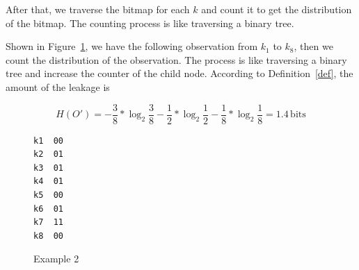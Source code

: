 After that, we traverse the bitmap for each $k$ and count it to get the distribution of the bitmap. The counting process is like traversing a binary tree. 

\begin{myexample}
Shown in Figure~\ref{fig:design:example2}, we have the following observation from $k_1$ to $k_8$, then we count the distribution of  the observation. The process is like traversing a binary tree and increase the counter of the child node. According to Definition~\ref{def}, the amount of the leakage is 

\begin{displaymath}
  H(O') = - \frac{3}{8}*\log_2{\frac{3}{8}}- \frac{1}{2}*\log_2{\frac{1}{2}}
  - \frac{1}{8}*\log_2{\frac{1}{8}} = 1.4 \,\mathrm{bits}
\end{displaymath}

\begin{figure}[h]
\begin{minipage}{0.4\linewidth}
\end{minipage}
\hfill
\begin{minipage}{0.18\linewidth}
{
\begin{lstlisting}[frame=none, numbers=none]
k1  00
k2  01
k3  01
k4  01
k5  00
k6  01
k7  11
k8  00
\end{lstlisting}
}
\end{minipage}
\hfill
\begin{minipage}{0.30\linewidth}
\end{minipage}
\caption{Example 2}\label{fig:design:example2}
\end{figure}
\end{myexample}


